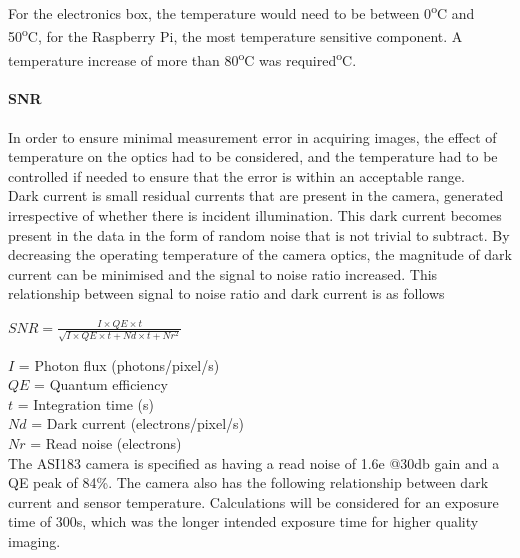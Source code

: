 For the electronics box, the temperature would need to be between 0\textsuperscript{o}C and 50\textsuperscript{o}C, for the Raspberry Pi, the most temperature sensitive component. A temperature increase of more than 80\textsuperscript{o}C was required\textsuperscript{o}C.\\

\paragraph{SNR}

In order to ensure minimal measurement error in acquiring images, the effect of temperature on the optics had to be considered, and the temperature had to be controlled if needed to ensure that the error is within an acceptable range.\\

Dark current is small residual currents that are present in the camera, generated irrespective of whether there is incident illumination. This dark current becomes present in the data in the form of random noise that is not trivial to subtract. By decreasing the operating temperature of the camera optics, the magnitude of dark current can be minimised and the signal to noise ratio increased. This relationship between signal to noise ratio and dark current is as follows\\

\begin{center}
 $SNR =  \frac{I\times QE\times t}{\sqrt{I\times QE\times t+Nd\times t+Nr^2}}$\\
\end{center}

$I$ = Photon flux (photons/pixel/s)\\
$QE$ = Quantum efficiency\\
$t$ = Integration time (s)\\
$Nd$ = Dark current (electrons/pixel/s)\\
$Nr$ = Read noise (electrons)\\

The ASI183 camera is specified as having a read noise of 1.6e @30db gain and a QE peak of 84\%. The camera also has the following relationship between dark current and sensor temperature. Calculations will be considered for an exposure time of 300s, which was the longer intended exposure time for higher quality imaging.  \\


